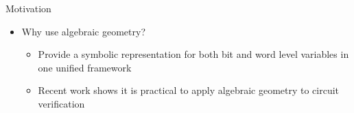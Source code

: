 \documentclass[xcolor=dvipsnames]{beamer}
\begin{document}
\begin{frame}{\large {Motivation}}
\begin{itemize}
\item Why use algebraic geometry?
	\begin{itemize}
        \item Provide a symbolic representation for both bit and word level variables in one unified framework
	\item Recent work shows it is practical to apply algebraic geometry to circuit verification
	\end{itemize}
\end{itemize}

\end{frame}
\end{document}
